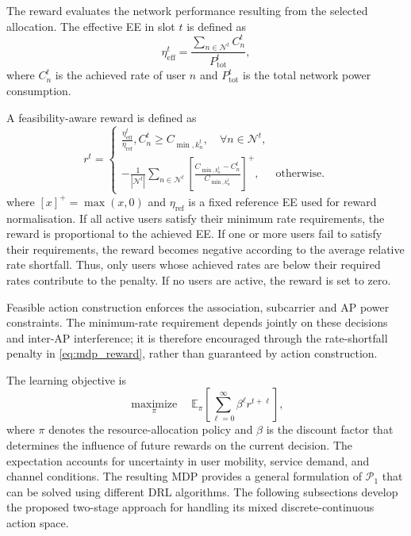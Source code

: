 \documentclass[journal]{IEEEtran}
\begin{document}
The reward evaluates the network performance resulting from the selected allocation. The effective EE in slot $t$ is defined as
\begin{equation}
\eta_{\mathrm{eff}}^{t}
=
\frac{\displaystyle
\sum_{n\in\mathcal{N}^{t}}C_{n}^{t}}
{\displaystyle P_{\mathrm{tot}}^{t}},
\label{eq:mdp_effective_ee}
\end{equation}
where $C_{n}^{t}$ is the achieved rate of user $n$ and $P_{\mathrm{tot}}^{t}$ is the total network power consumption.

A feasibility-aware reward is defined as
\begin{equation}
r^{t}=
\begin{cases}
    \displaystyle
    \frac{\eta_{\mathrm{eff}}^{t}}{\eta_{\mathrm{ref}}},
    C_{n}^{t}\geq C_{\min,k_{n}^{t}},
    \quad \forall n\in\mathcal{N}^{t},
    \\
    \displaystyle
    -\frac{1}{|\mathcal{N}^{t}|}
    \sum_{n\in\mathcal{N}^{t}}
    \left[
    \frac{C_{\min,k_{n}^{t}}-C_{n}^{t}}
    {C_{\min,k_{n}^{t}}}
    \right]^{+},
    &
    \text{otherwise}.
\end{cases}
\label{eq:mdp_reward}
\end{equation}
where $[x]^{+}=\max(x,0)$ and $\eta_{\mathrm{ref}}$ is a fixed reference EE used for reward normalisation. If all active users satisfy their minimum rate requirements, the reward is proportional to the achieved EE. If one or more users fail to satisfy their
requirements, the reward becomes negative according to the average relative rate shortfall. Thus, only users whose achieved rates are below their required rates contribute to the penalty. If no users are active, the reward is set to zero.

Feasible action construction enforces the association, subcarrier and AP power constraints. The minimum-rate requirement depends jointly on these decisions and inter-AP interference; it is therefore encouraged through the rate-shortfall penalty in
\eqref{eq:mdp_reward}, rather than guaranteed by action construction.

The learning objective is
\begin{equation}
\underset{\pi}{\operatorname{maximize}}\quad
\mathbb{E}_{\pi}
\left[
\sum_{\ell=0}^{\infty}
\beta^{\ell}r^{t+\ell}
\right],
\label{eq:mdp_policy_objective}
\end{equation}
where $\pi$ denotes the resource-allocation policy and $\beta$ is the discount factor that determines the influence of future rewards on the current decision. The expectation accounts for uncertainty in user mobility, service demand, and channel conditions. The resulting MDP provides a general formulation of $\mathcal{P}_{1}$ that can be solved using different DRL algorithms. The following subsections develop the
proposed two-stage approach for handling its mixed discrete-continuous action space.
\end{document}
